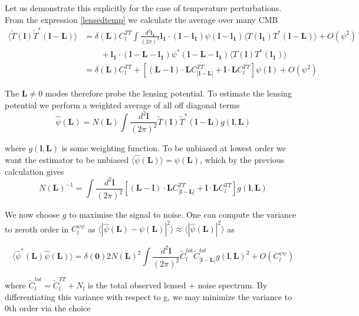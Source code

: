 \documentclass[a4paper,10pt]{article}
\renewcommand{\v}[1]{\mathbf{#1}}
\newcommand{\finttwo}[1]{\int \frac{d^2 \v{#1}}{(2\pi)^2}}
\begin{document}
Let us demonstrate this explicitly for the case of temperature perturbations. From the expression \ref{lensedtemp} we calculate the average over many CMB
\begin{equation}\begin{split}
\langle \tilde{T}(\v{l})\tilde{T}^*(\v{l}-\v{L})\rangle &= \delta(\v{L})C_l^{TT} \finttwo{l_1}  \v{l_1}\cdot(\v{l}-\v{l_1})\psi(\v{l}-\v{l_1}) \langle T(\v{l_1})T^*(\v{l}-\v{L})\rangle + O(\psi^2) \\
&\qquad + \v{l_1}\cdot(\v{l}-\v{L}-\v{l_1})\psi^*(\v{l}-\v{L}-\v{l_1}) \langle T(\v{l})T^*(\v{l_1})\rangle\\
&=\delta(\v{L})C_l^{TT} + [(\v{L}-\v{l})\cdot\v{L}C^{TT}_{|\v{l}-\v{L}|}+\v{l}\cdot\v{L}C_l^{TT}]\psi(\v{l}) + O(\psi^2)
\end{split}\end{equation}

The $\v{L}\neq 0 $ modes therefore probe the lensing potential. To estimate the lensing potential we perform a weighted average of all off diagonal terms
\begin{equation}
\hat{\psi}(\v{L}) = N(\v{L})\finttwo{l} \tilde{T}(\v{l})\tilde{T}^*(\v{l-L})g(\v{l},\v{L})
\end{equation}

where $g(\v{l},\v{L})$ is some weighting function. To be unbiased at lowest order we want the estimator to be unbiased $\langle \hat{\psi}(\v{L}) \rangle = \psi(\v{L})$, which by the previous calculation gives
\begin{equation}
N(\v{L})^{-1} = \finttwo{l} [(\v{L}-\v{l})\cdot\v{L}C^{TT}_{|\v{l}-\v{L}|}+\v{l}\cdot\v{L}C_l^{TT}]g(\v{l},\v{L})
\end{equation}

We now choose $g$ to maximise the signal to noise. One can compute the variance to zeroth order in $C_l^{\psi\psi}$ as $\langle| \hat{\psi}(\v{L})-\psi(\v{L})|^2 \rangle \approx 
\langle| \hat{\psi}(\v{L})|^2 \rangle$ as

\begin{equation}
\langle\hat{\psi}^*(\v{L}) \hat{\psi}(\v{L}) \rangle = \delta(\v{0})2N(\v{L})^2\finttwo{l}\tilde{C}_l^{tot}\tilde{C}_{|\v{l}-\v{L}|}^{tot}g(\v{l},\v{L})^2 + O(C_l^{\psi\psi})
\end{equation}

where $\tilde{C}_l^{tot} = \tilde{C}_l^{TT} + N_l$ is the total observed lensed + noise spectrum. By differentiating this variance with respect to g, we may minimize the variance to 0th order via the choice
\end{document}
